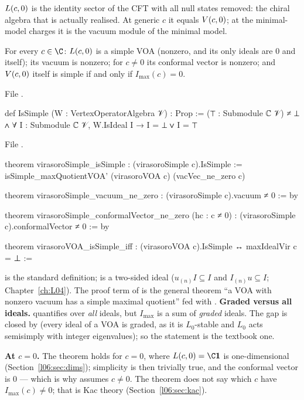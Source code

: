 \begin{physics}
$L(c,0)$ is the identity sector of the CFT with all null states removed: the chiral algebra that is
actually realised. At generic $c$ it equals $V(c,0)$; at the minimal-model charges it is the vacuum
module of the minimal model.
\end{physics}

\begin{theorem}\label{l06:thm:simple}
For every $c\in\C$: $L(c,0)$ is a simple VOA (nonzero, and its only ideals are $0$ and itself); its
vacuum is nonzero; for $c\ne0$ its conformal vector is nonzero; and $V(c,0)$ itself is simple if and
only if $I_{\max}(c) = 0$.
\end{theorem}

File .
\begin{leancode}
def IsSimple (W : VertexOperatorAlgebra 𝒱) : Prop :=
  (⊤ : Submodule ℂ 𝒱) ≠ ⊥ ∧ ∀ I : Submodule ℂ 𝒱, W.IsIdeal I → I = ⊥ ∨ I = ⊤
\end{leancode}
File .
\begin{leancode}
theorem virasoroSimple_isSimple : (virasoroSimple c).IsSimple :=
  isSimple_maxQuotientVOA' (virasoroVOA c) (vacVec_ne_zero c)

theorem virasoroSimple_vacuum_ne_zero : (virasoroSimple c).vacuum ≠ 0 := by

theorem virasoroSimple_conformalVector_ne_zero (hc : c ≠ 0) :
    (virasoroSimple c).conformalVector ≠ 0 := by

theorem virasoroVOA_isSimple_iff : (virasoroVOA c).IsSimple ↔ maxIdealVir c = ⊥ :=
\end{leancode}

\begin{dictionary}
 is the standard definition;  is a two-sided ideal ($u_{(n)}I\subseteq I$
and $I_{(n)}u\subseteq I$; Chapter~\ref{ch:L04}). The proof term of \allowbreak{} is the
general theorem ``a VOA with nonzero vacuum has a simple maximal quotient'' fed with
. \textbf{Graded versus all ideals.}  quantifies over \emph{all}
ideals, but $I_{\max}$ is a sum of \emph{graded} ideals. The gap is closed by
\allowbreak{}\allowbreak{}\allowbreak{} (every ideal of a VOA is graded, as it is $L_0$-stable and $L_0$
acts semisimply with integer eigenvalues); so the statement is the textbook one.

\textbf{At $c = 0$.} The theorem holds for $c = 0$, where $\lsixL = \C\lsixvac$ is one-dimensional
(Section~\ref{l06:sec:dims}); simplicity is then trivially true, and the conformal vector is $0$ --- which
is why \allowbreak{}\allowbreak{}\allowbreak{} assumes $c\ne0$. The theorem does not say which $c$
have $I_{\max}(c)\ne0$; that is Kac theory (Section~\ref{l06:sec:kac}).
\end{dictionary}

